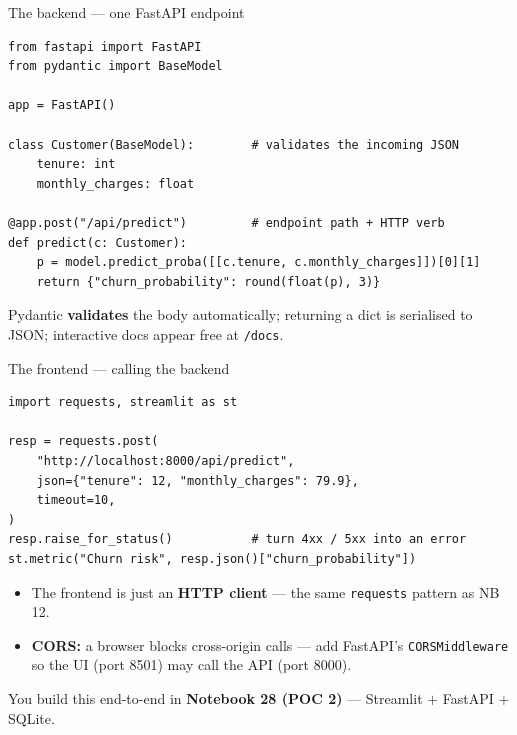\documentclass[aspectratio=169,11pt]{beamer}
\begin{document}
\begin{frame}[fragile]{The backend --- one FastAPI endpoint}
\begin{lstlisting}[style=py]
from fastapi import FastAPI
from pydantic import BaseModel

app = FastAPI()

class Customer(BaseModel):        # validates the incoming JSON
    tenure: int
    monthly_charges: float

@app.post("/api/predict")         # endpoint path + HTTP verb
def predict(c: Customer):
    p = model.predict_proba([[c.tenure, c.monthly_charges]])[0][1]
    return {"churn_probability": round(float(p), 3)}
\end{lstlisting}
  \vspace{-2pt}
  {\footnotesize Pydantic \textbf{validates} the body automatically; returning a dict is serialised to JSON; interactive docs appear free at \texttt{/docs}.}
\end{frame}

\begin{frame}[fragile]{The frontend --- calling the backend}
\begin{lstlisting}[style=py]
import requests, streamlit as st

resp = requests.post(
    "http://localhost:8000/api/predict",
    json={"tenure": 12, "monthly_charges": 79.9},
    timeout=10,
)
resp.raise_for_status()           # turn 4xx / 5xx into an error
st.metric("Churn risk", resp.json()["churn_probability"])
\end{lstlisting}
  \begin{itemize}
    \item The frontend is just an \textbf{HTTP client} --- the same \texttt{requests} pattern as NB 12.
    \item \textbf{CORS:} a browser blocks cross-origin calls --- add FastAPI's \texttt{CORSMiddleware} so the UI (port 8501) may call the API (port 8000).
  \end{itemize}
  {\footnotesize You build this end-to-end in \textbf{Notebook 28 (POC 2)} --- Streamlit $+$ FastAPI $+$ SQLite.}
\end{frame}

\end{document}
